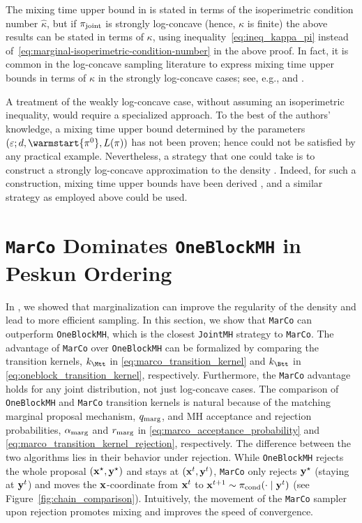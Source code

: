 \documentclass[onefignum,onetabnum]{siamonline250211}
\newcommand{\isocond}{\hat\kappa}
\newcommand{\bfx}{{\bf x}}
\newcommand{\bfy}{{\bf y}}
\newcommand{\pjoint}{\pi_{\rm joint}}
\newcommand{\pcond}{\pi_{\rm cond}}
\newcommand{\MarCo}{\textnormal{\texttt{MarCo}}\xspace}
\newcommand{\Joint}{\textnormal{\texttt{JointMH}}\xspace}
\newcommand{\OneblockMCMC}{\textnormal{\texttt{OneBlockMH}}\xspace}
\begin{document}
%
%

%
The mixing time upper bound in  is stated in terms of the isoperimetric condition number $\isocond$, but if $\pjoint$ is strongly log-concave (hence, $\kappa$ is finite) the above results can be stated in terms of $\kappa$, using inequality~\eqref{eq:ineq_kappa_pi} instead of~\eqref{eq:marginal-isoperimetric-condition-number} in the above proof.
In fact, it is common in the log-concave sampling literature to express mixing time upper bounds in terms of $\kappa$ in the strongly log-concave cases; see, e.g., \cite[Theorem 1]{dwivedi_log-concave_2019} and \cite[Theorem 1]{wu_minimax_2022}.
%
%
%

%
A treatment of the weakly log-concave case, without assuming an isoperimetric inequality, would require a specialized approach.
To the best of the authors' knowledge, a mixing time upper bound determined by the parameters $(\varepsilon; d,\warmstart{\pi^0},L(\pi))$ has not been proven; hence  could not be satisfied by any practical example.
Nevertheless, a strategy that one could take is to construct a strongly log-concave approximation to the density \cite[Section 4.3]{dalalyan_theoretical_2017}.
Indeed, for such a construction, mixing time upper bounds have been derived \cite[Corollary 4]{dwivedi_log-concave_2019}, and a similar strategy as employed above could be used.
%
 
%
\section{\MarCo Dominates \OneblockMCMC in Peskun Ordering}
%
\label{sec:theory_marco_vs_one_block}

In , we showed that marginalization can improve the regularity of the density and lead to more efficient sampling. In this section, we show that \MarCo can outperform \OneblockMCMC, which is the closest \Joint strategy to \MarCo.
The advantage of \MarCo over \OneblockMCMC can be formalized by comparing the transition kernels, $k_{\Mtt}$ in \eqref{eq:marco_transition_kernel} and $k_{\Btt}$ in \eqref{eq:oneblock_transition_kernel}, respectively.  
Furthermore, the \MarCo advantage holds for any joint distribution, not just log-concave cases. 
The comparison of \OneblockMCMC and \MarCo transition kernels is natural because of the matching marginal proposal mechanism, $q_{\rm marg}$, and MH acceptance and rejection probabilities, $\alpha_{\rm marg}$ and $r_{\rm marg}$ in \eqref{eq:marco_acceptance_probability} and  \eqref{eq:marco_transition_kernel_rejection}, respectively. 
%
The difference between the two algorithms lies in their behavior under rejection. 
While \OneblockMCMC rejects the whole proposal $(\bfx^\star,\bfy^\star)$ and stays at $(\bfx^t,\bfy^t)$, \MarCo only rejects $\bfy^\star$ (staying at $\bfy^t$) and moves the $\bfx$-coordinate from $\bfx^t$ to $\bfx^{t+1} \sim \pcond(\cdot \mid \bfy^t)$ (see Figure~\ref{fig:chain_comparison}).
Intuitively, the movement of the \MarCo sampler upon rejection promotes mixing and improves the speed of convergence.
\end{document}
